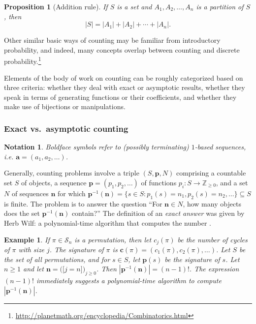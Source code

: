 \documentclass[12pt]{article}
\theoremstyle{plain}
\newtheorem{pro}{Proposition}
\newtheorem{notation}{Notation}
\newtheorem{exa}{Example}
\begin{document}
\begin{pro}[Addition rule]
If \( S \) is a set and \( A_1, A_2, \dots, A_n \) is a partition of \( S \), then
\[ |S| = |A_1| + |A_2| + \cdots + |A_n|. \]
\end{pro}

Other similar basic ways of counting
may be familiar from introductory probability,
and indeed, many concepts overlap between counting and discrete probability.\footnote{
\url{http://planetmath.org/encyclopedia/Combinatorics.html}
}

Elements of the body of work on counting can be roughly categorized based on three criteria:
whether they deal with exact or asymptotic results,
whether they speak in terms of generating functions or their coefficients, and
whether they make use of bijections or manipulations.


\subsubsection{Exact vs.\ asymptotic counting}
\begin{notation}
Boldface symbols refer to (possibly terminating) \(1\)-based sequences, i.e. \( \boldsymbol{a} = (a_1, a_2, \dots) \).%
\end{notation}

Generally, counting problems involve a triple \( (S, \boldsymbol{p}, N) \)
comprising
a countable set \(S\) of objects, a sequence \( \boldsymbol{p} = (p_1, p_2, \dots)  \) of functions \( p_i : S \rightarrow \mathbb{Z}_{\geq 0} \), and
a set \(N\) of sequences \( \boldsymbol{n} \) for which  \( \boldsymbol{p}^{-1}(\boldsymbol{n}) = \{ s \in S : p_1(s) = n_1, p_2(s) = n_2, \dots \} \subseteq S\)
 is finite.
The problem  is to answer the question
``For \(\boldsymbol{n} \in N\), how many objects does the set \( \boldsymbol{p}^{-1}(\boldsymbol{n}) \) contain?''
The definition of an \emph{exact answer} was given by Herb Wilf: a polynomial-time algorithm that computes the number \cite{companion}.

\begin{exa}
\label{exa:signature}
If \( \pi \in \mathcal{S}_n \) is a permutation, then let \( c_j(\pi) \) be the number of cycles of \( \pi \) with size \( j \).
The \emph{signature} of \( \pi \) is \( \boldsymbol{c}(\pi) = (c_1(\pi), c_2(\pi), \dots) \).
Let \( S \) be the set of all permutations, and for \( s \in S\),  let \( \boldsymbol{p}(s) \) be the signature of \( s \).
Let \( n \geq 1 \) and let \( \boldsymbol{n} = (\)\href{http://en.wikipedia.org/wiki/Iverson_bracket}{\([\)}\(j=n])_{j \geq 0} \).
Then \( |\boldsymbol{p}^{-1}(\boldsymbol{n})| = (n-1)! \).
The expression \( (n-1)! \) immediately suggests a polynomial-time algorithm to compute \( |\boldsymbol{p}^{-1}(\boldsymbol{n})| \).
\end{exa}
\end{document}
